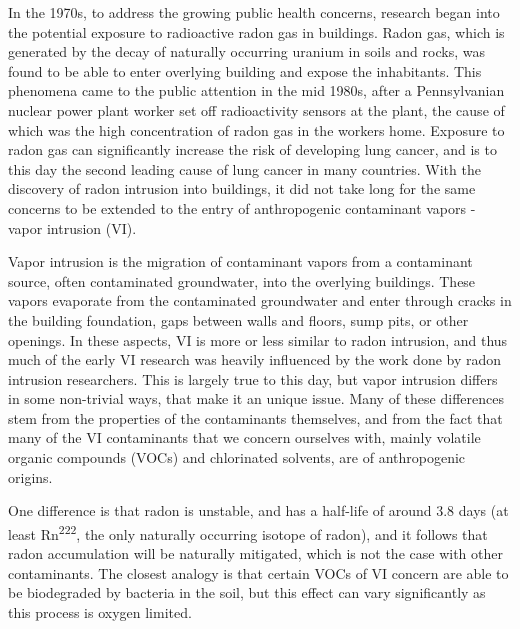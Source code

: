 In the 1970s, to address the growing public health concerns, research began into the potential exposure to radioactive radon gas in buildings.
Radon gas, which is generated by the decay of naturally occurring uranium in soils and rocks, was found to be able to enter overlying building and expose the inhabitants.
This phenomena came to the public attention in the mid 1980s, after a Pennsylvanian nuclear power plant worker set off radioactivity sensors at the plant, the cause of which was the high concentration of radon gas in the workers home\cite{noauthor_health_nodate}.
Exposure to radon gas can significantly increase the risk of developing lung cancer, and is to this day the second leading cause of lung cancer in many countries\cite{gaskin_janet_global_nodate}.
With the discovery of radon intrusion into buildings, it did not take long for the same concerns to be extended to the entry of anthropogenic contaminant vapors - vapor intrusion (VI).\par

Vapor intrusion is the migration of contaminant vapors from a contaminant source, often contaminated groundwater, into the overlying buildings.
These vapors evaporate from the contaminated groundwater and enter through cracks in the building foundation, gaps between walls and floors, sump pits, or other openings\cite{u.s._environmental_protection_agency_oswer_2015}.
In these aspects, VI is more or less similar to radon intrusion, and thus much of the early VI research was heavily influenced by the work done by radon intrusion researchers.
This is largely true to this day, but vapor intrusion differs in some non-trivial ways, that make it an unique issue.
Many of these differences stem from the properties of the contaminants themselves, and from the fact that many of the VI contaminants that we concern ourselves with, mainly volatile organic compounds (VOCs) and chlorinated solvents, are of anthropogenic origins.\par

One difference is that radon is unstable, and has a half-life of around 3.8 days (at least Rn\textsuperscript{222}, the only naturally occurring isotope of radon), and it follows that radon accumulation will be naturally mitigated, which is not the case with other contaminants\cite{schumacher_fluctuation_2012}.
The closest analogy is that certain VOCs of VI concern are able to be biodegraded by bacteria in the soil, but this effect can vary significantly as this process is oxygen limited\cite{u.s._environmental_protection_agency_oswer_2015,abreu_simulating_2006}.\par

